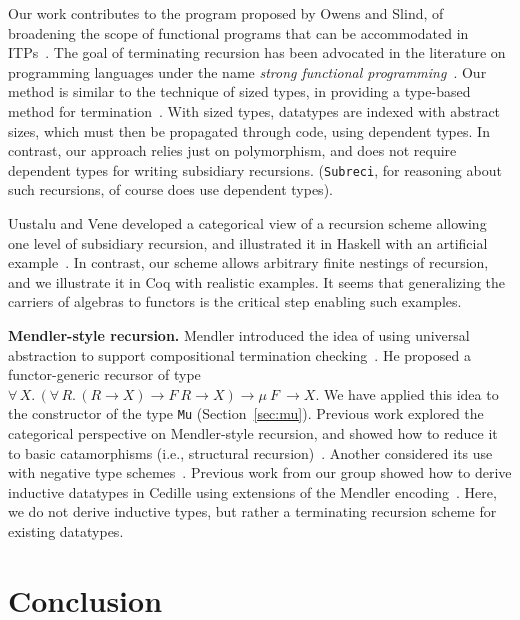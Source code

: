 \documentclass[a4paper,USenglish]{lipics-v2021}
\newcommand{\all}[2]{\forall\, #1.\, #2}
\begin{document}
Our work contributes to the program proposed by Owens and Slind, of
broadening the scope of functional programs that can be accommodated
in ITPs~\cite{owens+08}.  The goal of terminating recursion has been
advocated in the literature on programming languages under the name
\emph{strong functional programming}~\cite{turner95}.  Our method is
similar to the technique of sized types, in providing a type-based
method for termination~\cite{barthe04}.  With sized types, datatypes
are indexed with abstract sizes, which must then be propagated through
code, using dependent types.  In contrast, our approach relies just on
polymorphism, and does not require dependent types for writing
subsidiary recursions.  (\verb|Subreci|, for reasoning about such
recursions, of course does use dependent types).

Uustalu and Vene developed a categorical view of a recursion scheme
allowing one level of subsidiary recursion, and illustrated it in
Haskell with an artificial example~\cite{uustalu11}.  In contrast, our
scheme allows arbitrary finite nestings of recursion, and we
illustrate it in Coq with realistic examples.  It seems that
generalizing the carriers of algebras to functors is the critical step
enabling such examples. 

\textbf{Mendler-style recursion.}  Mendler introduced the idea of
using universal abstraction to support compositional termination
checking~\cite{mendler91}.  He proposed a functor-generic recursor of
type $\all{X}{(\all{R}{(R \to X) \to F\ R \to X}) \to \mu\ F\ \to
  X}$. We have applied this idea to the constructor of the type
\verb|Mu| (Section~\ref{sec:mu}).  Previous work explored the
categorical perspective on Mendler-style recursion, and showed how to
reduce it to basic catamorphisms (i.e., structural
recursion)~\cite{uustalu99}.  Another considered its use with negative
type schemes~\cite{ahn11}.  Previous work from our group showed how to
derive inductive datatypes in Cedille using extensions of the Mendler
encoding~\cite{firsov+18b,firsov+18a}.  Here, we do not derive
inductive types, but rather 
a terminating recursion scheme for existing datatypes.

\section{Conclusion}
\end{document}
